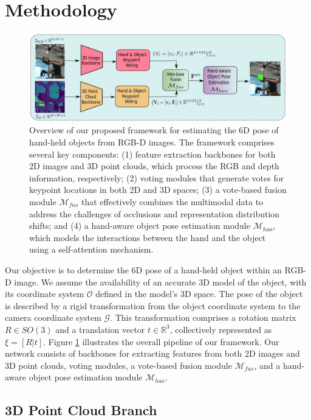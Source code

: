 \section{Methodology}
\label{sec:methodology}

\begin{figure}[h!]
	\centering
	\includegraphics[width=0.98\linewidth]{figs/overview}
	\caption{Overview of our proposed framework for estimating the 6D pose of hand-held objects from RGB-D images. The framework comprises several key components: (1) feature extraction backbones for both 2D images and 3D point clouds, which process the RGB and depth information, respectively; (2) voting modules that generate votes for keypoint locations in both 2D and 3D spaces; (3) a vote-based fusion module $\mathcal{M}_{fus}$ that effectively combines the multimodal data to address the challenges of occlusions and representation distribution shifts; and (4) a hand-aware object pose estimation module $\mathcal{M}_{hao}$, which models the interactions between the hand and the object using a self-attention mechanism.}
	\label{fig:overview}
\end{figure}

Our objective is to determine the 6D pose of a hand-held object within an RGB-D image. We assume the availability of an accurate 3D model of the object, with its coordinate system $\mathcal{O}$ defined in the model's 3D space. The pose of the object is described by a rigid transformation from the object coordinate system to the camera coordinate system $\mathcal{G}$. This transformation comprises a rotation matrix $R \in SO(3)$ and a translation vector $t \in \mathbb{R}^{3}$, collectively represented as $\xi = [R|t]$. Figure \ref{fig:overview} illustrates the overall pipeline of our framework. Our network consists of backbones for extracting features from both 2D images and 3D point clouds, voting modules, a vote-based fusion module $\mathcal{M}_{fus}$, and a hand-aware object pose estimation module $\mathcal{M}_{hao}$.

\subsection{3D Point Cloud Branch}

